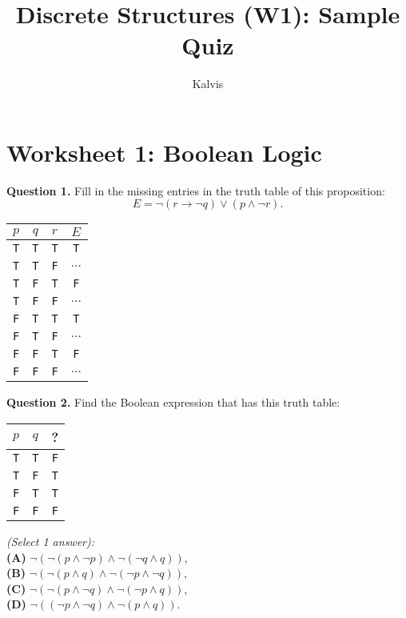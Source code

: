 \documentclass[jou]{apa6}
\title{Discrete Structures (W1): Sample Quiz}
\author{Kalvis}
\affiliation{RBS}
\begin{document}

\twocolumn

\section{Worksheet 1: Boolean Logic}

{\bf Question 1.} Fill in the missing entries in the truth table of this proposition:
$$E = \neg(r \rightarrow \neg q) \vee (p \wedge \neg r).$$

\begin{tabular}{ c | c | c | c }
$p$ & $q$ & $r$ & $E$ \\ \hline
{\tt T} & {\tt T} & {\tt T} & {\tt T} \\ \hline
{\tt T} & {\tt T} & {\tt F} & $\ldots$ \\ \hline
{\tt T} & {\tt F} & {\tt T} & {\tt F} \\ \hline
{\tt T} & {\tt F} & {\tt F} & $\ldots$ \\ \hline
{\tt F} & {\tt T} & {\tt T} & {\tt T} \\ \hline
{\tt F} & {\tt T} & {\tt F} & $\ldots$ \\ \hline
{\tt F} & {\tt F} & {\tt T} & {\tt F} \\ \hline
{\tt F} & {\tt F} & {\tt F} & $\ldots$ \\ \hline
\end{tabular}

\vspace{10pt}
{\bf Question 2.} Find the Boolean expression that has this truth table:

\begin{tabular}{ c | c | c }
$p$ & $q$ & ? \\ \hline
{\tt T} & {\tt T} & {\tt F} \\ \hline
{\tt T} & {\tt F} & {\tt T} \\ \hline
{\tt F} & {\tt T} & {\tt T} \\ \hline
{\tt F} & {\tt F} & {\tt F} \\ \hline
\end{tabular}

\noindent
\vspace{3pt}
{\em (Select 1 answer):}\\
{\bf (A)} $\neg (\neg ( p \wedge \neg p) \wedge \neg (\neg q \wedge q))$,\\
{\bf (B)} $\neg (\neg ( p \wedge q) \wedge \neg (\neg p \wedge \neg q))$,\\
{\bf (C)} $\neg (\neg ( p \wedge \neg q) \wedge \neg (\neg p \wedge q))$,\\
{\bf (D)} $\neg (( \neg p \wedge \neg q) \wedge \neg (p \wedge q))$.
\end{document}
